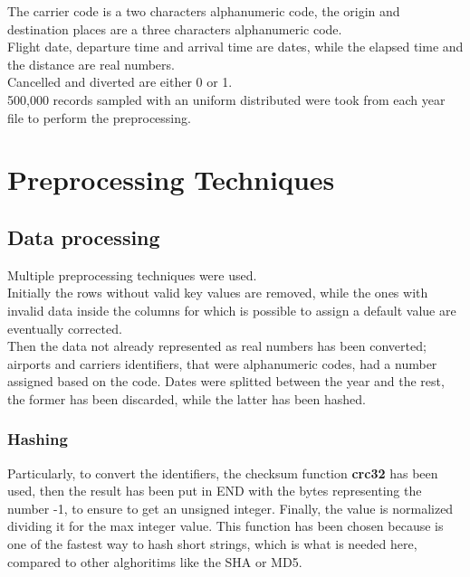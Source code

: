 \documentclass[
	letterpaper, %
	10pt, %
]{class}
\begin{document}
The carrier code is a two characters alphanumeric code, the origin and destination places are a three characters alphanumeric code.\\
Flight date, departure time and arrival time are dates, while the elapsed time and the distance are real numbers.\\
Cancelled and diverted are either 0 or 1.\\

500,000 records sampled with an uniform distributed were took from each year file to perform the preprocessing.


\section{Preprocessing Techniques}

\subsection{Data processing}

Multiple preprocessing techniques were used.\\

Initially the rows without valid key values are removed, while the ones with invalid data inside the columns for which is possible to assign a default value are eventually corrected.\\

Then the data not already represented as real numbers has been converted; airports and carriers identifiers, that were alphanumeric codes, had a number assigned based on the code. Dates were splitted between the year and the rest, the former has been discarded, while the latter has been hashed.\\

\subsubsection{Hashing}

Particularly, to convert the identifiers, the checksum function \textbf{crc32} \cite{crc32} has been used, then the result has been put in END with the bytes representing the number -1, to ensure to get an unsigned integer. Finally, the value is normalized dividing it for the max integer value.
This function has been chosen because is one of the fastest way to hash short strings, which is what is needed here, compared to other alghoritims like the SHA or MD5.\\
\end{document}
